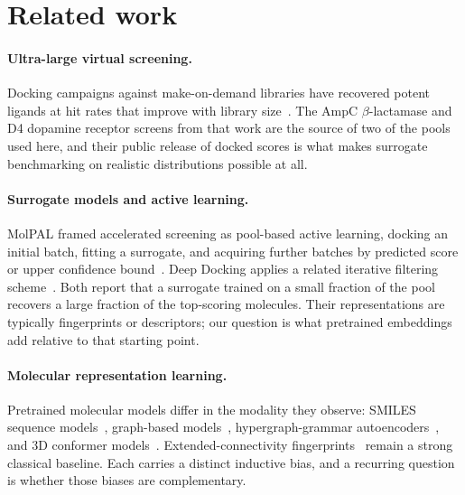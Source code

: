 \section{Related work}
\label{sec:related}

\paragraph{Ultra-large virtual screening.}
Docking campaigns against make-on-demand libraries have recovered potent
ligands at hit rates that improve with library
size~\citep{lyu2019ultralarge}. The AmpC $\beta$-lactamase and D4 dopamine
receptor screens from that work are the source of two of the pools used here,
and their public release of docked scores is what makes surrogate benchmarking
on realistic distributions possible at all.

\paragraph{Surrogate models and active learning.}
MolPAL framed accelerated screening as pool-based active
learning, docking an initial batch, fitting a surrogate, and acquiring further
batches by predicted score or upper confidence
bound~\citep{graff2021molpal}. Deep Docking applies a related iterative
filtering scheme~\citep{gentile2022deepdocking}. Both report that a
surrogate trained on a small fraction of the pool recovers a large fraction of
the top-scoring molecules. Their representations are typically fingerprints or
descriptors; our question is what pretrained embeddings add relative to that
starting point.

\paragraph{Molecular representation learning.}
Pretrained molecular models differ in the modality they observe: SMILES
sequence models~\citep{ross2022molformer,soares2025smited}, graph-based
models~\citep{rong2020grover}, hypergraph-grammar
autoencoders~\citep{kajino2019mhg}, and 3D conformer
models~\citep{zhou2023unimol}. Extended-connectivity
fingerprints~\citep{rogers2010ecfp} remain a strong classical baseline. Each
carries a distinct inductive bias, and a recurring question is whether those
biases are complementary.

